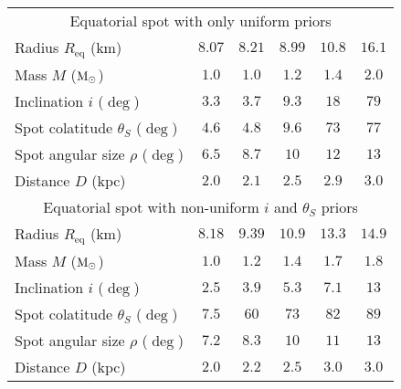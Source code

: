 \documentclass{wihuri}
\def\msun{{\rm M_{\odot}}}
\def\thetas{\theta_{S}}
\def\req{R_{\mathrm{eq}}}
\begin{document}
\begin{center}
\begin{table*}
\begin{footnotesize}
\begin{center}
\begin{adjustwidth}{-3cm}{}
\begin{tabular}[c]{l c c c c c}
      \multicolumn{6}{c}{Equatorial spot with only uniform priors} \\ %
      Radius $\req$ (km) & $8.07$ & $8.21$ & $8.99$ & $10.8$ & $16.1$  \\ %
      Mass $M$ ($\msun$) & $1.0$ & $1.0$ & $1.2$ & $1.4$ & $2.0$  \\ %
      Inclination $i$ ($\deg$) & $3.3$ & $3.7$ & $9.3$ & $18$ & $79$ \\ %
      Spot colatitude $\thetas$ ($\deg$) & $4.6$ & $4.8$ & $9.6$ & $73$ & $77$ \\ %
      Spot angular size $\rho$ ($\deg$) & $6.5$ & $8.7$ & $10$ & $12$ & $13$ \\ %
      Distance $D$ (kpc) &  $2.0$ & $2.1$ & $2.5$ & $2.9$ & $3.0$ \\ \hline
      
      \multicolumn{6}{c}{Equatorial spot with non-uniform $i$ and $\thetas$ priors} \\ %
      Radius $\req$ (km) & $8.18$ & $9.39$ & $10.9$ & $13.3$ & $14.9$  \\ %
      Mass $M$ ($\msun$) & $1.0$ & $1.2$ & $1.4$ & $1.7$ & $1.8$  \\ %
      Inclination $i$ ($\deg$) & $2.5$ & $3.9$ & $5.3$ & $7.1$ & $13$ \\ %
      Spot colatitude $\thetas$ ($\deg$) & $7.5$ & $60$ & $73$ & $82$ & $89$ \\ %
      Spot angular size $\rho$ ($\deg$) & $7.2$ & $8.3$ & $10$ & $11$ & $13$ \\ %
      Distance $D$ (kpc) & $2.0$ & $2.2$ & $2.5$ & $3.0$ & $3.0$ \\ 


    \hline
  \end{tabular}
    \end{adjustwidth}
  \end{center} 
  \end{footnotesize}
  \end{table*}
\end{center} 
\end{document}
